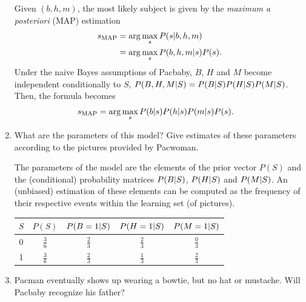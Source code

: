 \documentclass[11pt, a4paper]{article}
\begin{document}
\begin{enumerate}
    \begin{solution}
        Given $(b, h, m)$, the most likely subject is given by the \emph{maximum a posteriori} (MAP) estimation
        \begin{align*}
            s_{\text{MAP}} & = \arg\max_{s} P(s \vert b, h, m) \\
            & = \arg\max_{s} P(b, h, m \vert s) P(s) .
        \end{align*}
        Under the naive Bayes assumptions of Pacbaby, $B$, $H$ and $M$ become independent conditionally to $S$, \ie{} $P(B, H, M \vert S) = P(B \vert S) P(H \vert S) P(M \vert S)$. Then, the formula becomes
        \begin{align*}
            s_{\text{MAP}} & = \arg\max_{s} P(b \vert s) P(h \vert s) P(m \vert s) P(s) .
        \end{align*}
    \end{solution}
    
    \item What are the parameters of this model? Give estimates of these parameters according to the pictures provided by Pacwoman.
    
    \begin{solution}
        The parameters of the model are the elements of
        the prior vector $P(S)$ and the (conditional) probability matrices $P(B \vert S)$, $P(H \vert S)$ and $P(M \vert S)$. An (unbiased) estimation of these elements can be computed as the frequency of their respective events within the learning set (of pictures).
        
        \begin{table}[h]
            \centering
            \begin{tabular}{c|cccc}
                \toprule
                $S$ & $P(S)$ & $P(B = 1 \vert S)$ & $P(H = 1 \vert S)$ & $P(M = 1 \vert S)$ \\
                \midrule
                0 & $\frac{3}{6}$ & $\frac{2}{3}$ & $\frac{2}{3}$ & $\frac{0}{3}$ \\
                1 & $\frac{3}{6}$ & $\frac{2}{3}$ & $\frac{1}{3}$ & $\frac{2}{3}$ \\
                \bottomrule
            \end{tabular}
        \end{table}
    \end{solution}
    
    \item Pacman eventually shows up wearing a bowtie, but no hat or mustache. Will Pacbaby recognize his father?
    

\end{enumerate}
\end{document}

